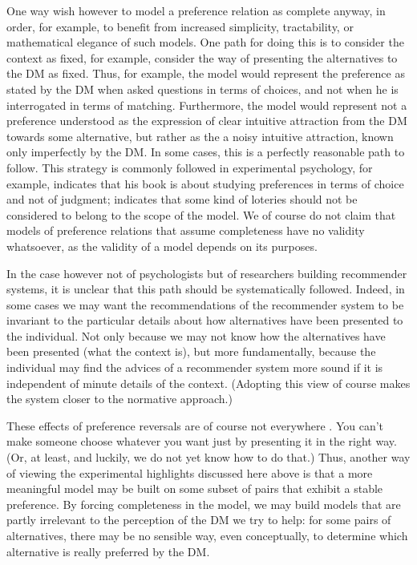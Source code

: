 \documentclass[french, english]{llncs}
\begin{document}
One way wish however to model a preference relation as complete anyway, in order, for example, to benefit from increased simplicity, tractability, or mathematical elegance of such models. One path for doing this is to consider the context as fixed, for example, consider the way of presenting the alternatives to the \ac{DM} as fixed. Thus, for example, the model would represent the preference as stated by the \ac{DM} when asked questions in terms of choices, and not when he is interrogated in terms of matching. Furthermore, the model would represent not a preference understood as the expression of clear intuitive attraction from the \ac{DM} towards some alternative, but rather as the a noisy intuitive attraction, known only imperfectly by the \ac{DM}. 
	In some cases, this is a perfectly reasonable path to follow. This strategy is commonly followed in experimental psychology, for example, \citet{luce_utility_2000} indicates that his book is about studying preferences in terms of choice and not of judgment; \citet{maccrimmon_real_1980} indicates that some kind of loteries should not be considered to belong to the scope of the model. We of course do not claim that models of preference relations that assume completeness have no validity whatsoever, as the validity of a model depends on its purposes. 

In the case however not of psychologists but of researchers building recommender systems, it is unclear that this path should be systematically followed. Indeed, in some cases we may want the recommendations of the recommender system to be invariant to the particular details about how alternatives have been presented to the individual. Not only because we may not know how the alternatives have been presented (what the context is), but more fundamentally, because the individual may find the advices of a recommender system more sound if it is independent of minute details of the context. (Adopting this view of course makes the system closer to the normative approach.)
	
	These effects of preference reversals are of course not everywhere \citep[p. xvi]{lichtenstein_construction_2006}. You can’t make someone choose whatever you want just by presenting it in the right way. (Or, at least, and luckily, we do not yet know how to do that.) Thus, another way of viewing the experimental highlights discussed here above is that a more meaningful model may be built on some subset of pairs that exhibit a stable preference. By forcing completeness in the model, we may build models that are partly irrelevant to the perception of the \ac{DM} we try to help: for some pairs of alternatives, there may be no sensible way, even conceptually, to determine which alternative is really preferred by the \ac{DM}.
	
\end{document}
